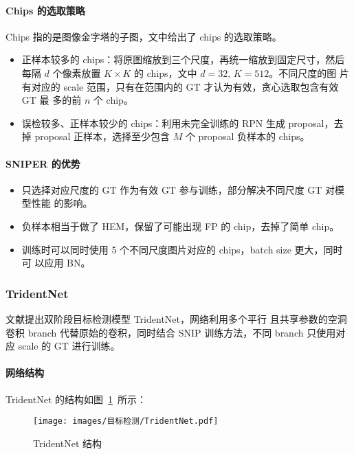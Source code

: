 \paragraph{Chips 的选取策略}
Chips 指的是图像金字塔的子图，文中给出了 chips 的选取策略。

\begin{itemize}
  \item 正样本较多的 chips：将原图缩放到三个尺度，再统一缩放到固定尺寸，然后每隔
    $d$ 个像素放置 $K \times K$ 的 chips，文中 $d = 32,\,K = 512$。不同尺度的图
    片有对应的 scale 范围，只有在范围内的 GT 才认为有效，贪心选取包含有效 GT 最
    多的前 $n$ 个 chip。
  \item 误检较多、正样本较少的 chips：利用未完全训练的 RPN 生成 proposal，去掉
    proposal 正样本，选择至少包含 $M$ 个 proposal 负样本的 chips。
\end{itemize}

\paragraph{SNIPER 的优势}
\begin{itemize}
  \item 只选择对应尺度的 GT 作为有效 GT 参与训练，部分解决不同尺度 GT 对模型性能
    的影响。 
  \item 负样本相当于做了 HEM，保留了可能出现 FP 的 chip，去掉了简单 chip。
  \item 训练时可以同时使用 5 个不同尺度图片对应的 chips，batch size 更大，同时可
    以应用 BN。
\end{itemize}

\subsubsection{TridentNet}
文献提出双阶段目标检测模型 TridentNet，网络利用多个平行
且共享参数的空洞卷积 branch 代替原始的卷积，同时结合 SNIP 训练方法，不同 branch
只使用对应 scale 的 GT 进行训练。 

\paragraph{网络结构}
TridentNet 的结构如图~\ref{fig:tridentnet}~所示：

\begin{figure}[ht]
  \centering
  \texttt{[image: images/目标检测/TridentNet.pdf]}
  \caption{TridentNet 结构}\label{fig:tridentnet}
\end{figure}

